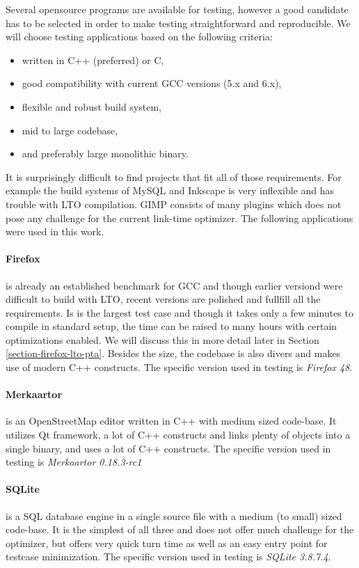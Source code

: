 Several opensource programs are available for testing, however a good candidate has
to be selected in order to make testing straightforward and reproducible.
We will choose testing applications based on the following criteria:

\begin{itemize}
	\item written in C++ (preferred) or C,
	\item good compatibility with current GCC versions (5.x and 6.x),
	\item flexible and robust build system,
	\item mid to large codebase,
	\item and preferably large monolithic binary.
\end{itemize}

It is surprisingly difficult to find projects that fit all of those
requirements. For example the build systems of MySQL and Inkscape is very
inflexible and has trouble with LTO compilation. GIMP consists of many plugins
which does not pose any challenge for the current link-time optimizer. The
following applications were used in this work.

\paragraph{Firefox} is already an established benchmark for GCC \cite{glek2010}
and though earlier versiond were difficult to build with LTO, recent versions
are polished and fullfill all the requirements. Is is the largest test case and
though it takes only a few minutes to compile in standard setup, the time can be
raised to many hours with certain optimizations enabled. We will discuss this in
more detail later in Section \ref{section-firefox-lto-pta}. Besides the size,
the codebase is also divers and makes use of modern C++ constructs. The specific
version used in testing is {\it Firefox 48}.

\paragraph{Merkaartor} is an OpenStreetMap editor written in C++ with medium
sized code-base. It utilizes Qt framework, a lot of C++ constructs and links
plenty of objects into a single binary, and uses a lot of C++ constructs.  The
specific version used in testing is {\it Merkaartor 0.18.3-rc1}

\paragraph{SQLite} is a SQL database engine in a single source file with a
medium (to small) sized code-base. It is the simplest of all three and does not
offer much challenge for the optimizer, but offers very quick turn time as well
as an easy entry point for testcase minimization. The specific version used in
testing is {\it SQLite 3.8.7.4}.

